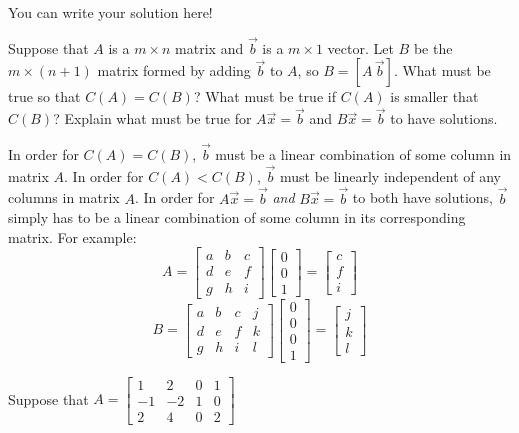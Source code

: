 \documentclass[]{exam}
\begin{document}
\begin{questions}
\begin{solution}
	You can write your solution here!
\end{solution}

\question Suppose that $A$ is a $m \times n$ matrix and $\vec{b}$ is a $m \times 1$ vector. Let $B$ be the $m \times (n+1)$ matrix formed by adding $\vec{b}$ to $A$, so $B = [A \, \vec{b}]$. What must be true so that $C(A)=C(B)$? What must be true if $C(A)$ is smaller that $C(B)$? Explain what must be true for $A \vec{x} = \vec{b}$ and $B \vec{x} = \vec{b}$ to have solutions. 


\begin{solution}
	In order for $C(A) = C(B)$, $\vec{b}$ must be a linear combination of some column in matrix $A$.  In order for $C(A) < C(B)$, $\vec{b}$ must be linearly independent of any columns in matrix $A$.  In order for $A\vec{x}=\vec{b}$ \emph{and} $B\vec{x}=\vec{b}$ to both have solutions, $\vec{b}$ simply has to be a linear combination of some column in its corresponding matrix.  For example:
	\[
		A = \begin{bmatrix}
			a & b & c \\
			d & e & f \\
			g & h & i
		\end{bmatrix}
		\begin{bmatrix}
			0 \\ 0 \\ 1
		\end{bmatrix} =
		\begin{bmatrix}
			c \\ f \\ i
		\end{bmatrix}
	\]
	\[
		B = \begin{bmatrix}
			a & b & c & j \\
			d & e & f & k \\
			g & h & i & l
		\end{bmatrix}
		\begin{bmatrix}
			0 \\ 0 \\ 0 \\ 1
		\end{bmatrix} =
		\begin{bmatrix}
			j \\ k \\ l
		\end{bmatrix}
	\]
\end{solution}

\newpage
\question Suppose that $A = 
\begin{bmatrix}
	1 & 2 & 0 & 1\\
	-1 & -2 & 1 & 0\\
	2 & 4 & 0 & 2
\end{bmatrix}$
\begin{parts}
	


\end{parts}
\end{questions}
\end{document}
